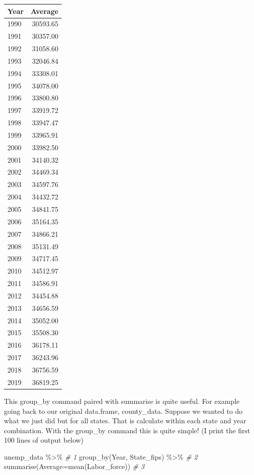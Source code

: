\documentclass[
]{book}
\newenvironment{Shaded}{\begin{snugshade}}{\end{snugshade}}
\newcommand{\AttributeTok}[1]{\textcolor[rgb]{0.77,0.63,0.00}{#1}}
\newcommand{\CommentTok}[1]{\textcolor[rgb]{0.56,0.35,0.01}{\textit{#1}}}
\newcommand{\FunctionTok}[1]{\textcolor[rgb]{0.00,0.00,0.00}{#1}}
\newcommand{\NormalTok}[1]{#1}
\newcommand{\SpecialCharTok}[1]{\textcolor[rgb]{0.00,0.00,0.00}{#1}}
\begin{document}
\begin{tabular}{l|r}
\hline
Year & Average\\
\hline
1990 & 30593.65\\
\hline
1991 & 30357.00\\
\hline
1992 & 31058.60\\
\hline
1993 & 32046.84\\
\hline
1994 & 33308.01\\
\hline
1995 & 34078.00\\
\hline
1996 & 33800.80\\
\hline
1997 & 33919.72\\
\hline
1998 & 33947.47\\
\hline
1999 & 33965.91\\
\hline
2000 & 33982.50\\
\hline
2001 & 34140.32\\
\hline
2002 & 34469.34\\
\hline
2003 & 34597.76\\
\hline
2004 & 34432.72\\
\hline
2005 & 34841.75\\
\hline
2006 & 35164.35\\
\hline
2007 & 34866.21\\
\hline
2008 & 35131.49\\
\hline
2009 & 34717.45\\
\hline
2010 & 34512.97\\
\hline
2011 & 34586.91\\
\hline
2012 & 34454.88\\
\hline
2013 & 34656.59\\
\hline
2014 & 35052.00\\
\hline
2015 & 35508.30\\
\hline
2016 & 36178.11\\
\hline
2017 & 36243.96\\
\hline
2018 & 36756.59\\
\hline
2019 & 36819.25\\
\hline
\end{tabular}

This group\_by command paired with summarise is quite useful. For example going back to our original data.frame, county\_data. Suppose we wanted to do what we just did but for all states. That is calculate within each state and year combination. With the group\_by command this is quite simple! (I print the first 100 lines of output below)

\begin{Shaded}
\begin{Highlighting}[]
\NormalTok{unemp\_data }\SpecialCharTok{\%\textgreater{}\%}                          \CommentTok{\# 1}
  \FunctionTok{group\_by}\NormalTok{(Year, State\_fips) }\SpecialCharTok{\%\textgreater{}\%}        \CommentTok{\# 2}
  \FunctionTok{summarise}\NormalTok{(}\AttributeTok{Average=}\FunctionTok{mean}\NormalTok{(Labor\_force))  }\CommentTok{\# 3}
\end{Highlighting}
\end{Shaded}
\end{document}
